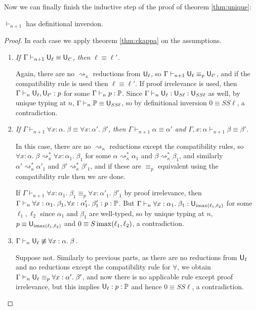 Now we can finally finish the inductive step of the proof of theorem \ref{thm:unique}:

\begin{theorem}\label{thm:1dinv}
$\vdash_{n+1}$ has definitional inversion.
\end{theorem}
\begin{proof}
In each case we apply theorem \ref{thm:ckappa} on the assumptions.
\begin{enumerate}
\item \emph{If $\Gamma\vdash_{n+1} \U_\ell\equiv\U_{\ell'}$, then $\ell\equiv\ell'$.}

Again, there are no $\rightsquigarrow_\kappa$ reductions from $\mathsf{U}_\ell$, so $\Gamma\vdash_{n+1} \U_\ell\equiv_p\U_{\ell'}$, and if the compatibility rule is used then $\ell\equiv\ell'$. If proof irrelevance is used, then $\Gamma\vdash_n\U_\ell,\U_{\ell'}:p$ for some $\Gamma\vdash_n p:\P$. Since $\Gamma\vdash_n\U_\ell:\U_{S\ell}:\U_{SS\ell}$ as well, by unique typing at $n$, $\Gamma\vdash_n \P\equiv \U_{SS\ell}$, so by definitional inversion $0\equiv SS\ell$, a contradiction.

\item \emph{If $\Gamma\vdash_{n+1} \forall x:\alpha.\;\beta\equiv\forall x:\alpha'.\;\beta'$, then $\Gamma\vdash_{n+1} \alpha\equiv\alpha'$ and $\Gamma,x:\alpha\vdash_{n+1} \beta\equiv \beta'$.}

In this case, there are no $\rightsquigarrow_\kappa$ reductions except the compatibility rules, so $\forall x:\alpha.\;\beta\rightsquigarrow_\kappa^*\forall x:\alpha_1.\;\beta_1$ for some $\alpha\rightsquigarrow_\kappa^*\alpha_1$ and $\beta\rightsquigarrow_\kappa^*\beta_1$, and similarly $\alpha'\rightsquigarrow_\kappa^*\alpha'_1$ and $\beta'\rightsquigarrow_\kappa^*\beta'_1$, and if these are $\equiv_p$ equivalent using the compatibility rule then we are done.

If $\Gamma\vdash_{n+1}\forall x:\alpha_1.\;\beta_1\equiv_p\forall x:\alpha'_1.\;\beta'_1$ by proof irrelevance, then $\Gamma\vdash_n\forall x:\alpha_1.\;\beta_1,\forall x:\alpha'_1.\;\beta'_1:p:\P$. But $\Gamma\vdash_n\forall x:\alpha_1.\;\beta_1:\U_{\imax(\ell_1,\ell_2)}$ for some $\ell_1,\ell_2$ since $\alpha_1$ and $\beta_1$ are well-typed, so by unique typing at $n$, $p\equiv\mathsf{U}_{\operatorname{imax}(\ell_1,\ell_2)}$ and $0\equiv S\operatorname{imax}(\ell_1,\ell_2)$, a contradiction.

\item \emph{$\Gamma\vdash_n \U_\ell\not\equiv\forall x:\alpha.\;\beta$.}

Suppose not. Similarly to previous parts, as there are no reductions from $\mathsf{U}_\ell$ and no reductions except the compatibility rule for $\forall$, we obtain $\Gamma\vdash_n\U_\ell\equiv_p\forall x:\alpha'.\;\beta'$, and now there is no applicable rule except proof irrelevance, but this implies $\mathsf{U}_\ell:p:\mathbb{P}$ and hence $0\equiv SS\ell$, a contradiction.
\end{enumerate}
\end{proof}

